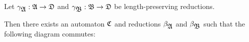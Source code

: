 \begin{lemma}
Let $\gamma_{\mbox{$\mathfrak{A}$}} : \mbox{$\mathfrak{A}$} \to \mbox{$\mathfrak{D}$}$ and $\gamma_{\mbox{$\mathfrak{B}$}} : \mbox{$\mathfrak{B}$} \to
\mbox{$\mathfrak{D}$}$ be length-preserving reductions.

Then there exists an automaton $\mbox{$\mathfrak{C}$}$ and reductions $\beta_{\mbox{$\mathfrak{A}$}}$ and
$\beta_{\mbox{$\mathfrak{B}$}}$ such that the following diagram commutes:
\begin{center}
\end{center}
\end{lemma}


